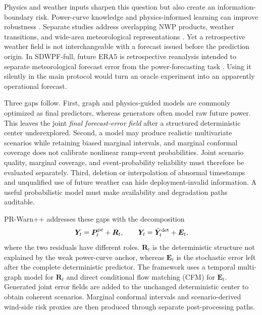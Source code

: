 \documentclass[journal]{IEEEtran}
\begin{document}
Physics and weather inputs sharpen this question but also create an information-boundary risk. Power-curve knowledge and physics-informed learning can improve robustness \cite{gao2025tgdpF,liu2024physicsrl}. Separate studies address overlapping NWP products, weather transitions, and wide-area meteorological representations \cite{zhao2025nwp,zhang2026transitional,cao2026joint}. Yet a retrospective weather field is not interchangeable with a forecast issued before the prediction origin. In SDWPF-full, future ERA5 is retrospective reanalysis intended to separate meteorological forecast error from the power-forecasting task \cite{zhou2024sdwpf}. Using it silently in the main protocol would turn an oracle experiment into an apparently operational forecast.

Three gaps follow. First, graph and physics-guided models are commonly optimized as final predictors, whereas generators often model raw future power. This leaves the joint \emph{final forecast-error field} after a structured deterministic center underexplored. Second, a model may produce realistic multivariate scenarios while retaining biased marginal intervals, and marginal conformal coverage does not calibrate nonlinear ramp-event probabilities. Joint scenario quality, marginal coverage, and event-probability reliability must therefore be evaluated separately. Third, deletion or interpolation of abnormal timestamps and unqualified use of future weather can hide deployment-invalid information. A useful probabilistic model must make availability and degradation paths auditable.

PR-Warn++ addresses these gaps with the decomposition
\begin{equation}
\bm Y_t=\bm P^{\rm pc}_t+\bm R_t,
\qquad
\bm Y_t=\hat{\bm Y}^{\rm det}_t+\bm E_t,
\label{eq:two_residuals_intro}
\end{equation}
where the two residuals have different roles. $\bm R_t$ is the deterministic structure not explained by the weak power-curve anchor, whereas $\bm E_t$ is the stochastic error left after the complete deterministic predictor. The framework uses a temporal multi-graph model for $\bm R_t$ and direct conditional flow matching (CFM) for $\bm E_t$. Generated joint error fields are added to the unchanged deterministic center to obtain coherent scenarios. Marginal conformal intervals and scenario-derived wind-side risk proxies are then produced through separate post-processing paths.
\end{document}
